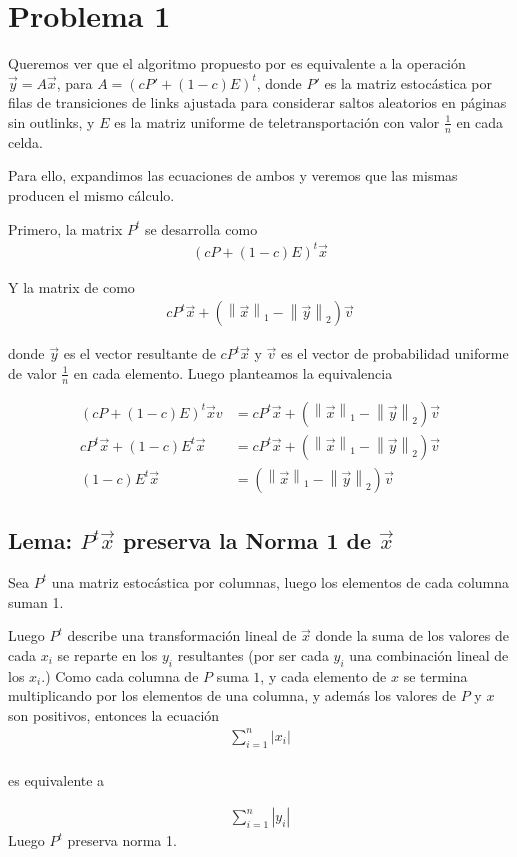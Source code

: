 \newcommand{\vectornorm}[1]{\left\|#1\right\|}
\section{Problema 1}
Queremos ver que el algoritmo propuesto por \cite[Algoritmo 1]{Kamvar2003} es equivalente
a la operación $\vec{y} = A\vec{x}$, para $A=(cP' + (1-c)E)^{t}$, donde $P'$ es la matriz 
estocástica por filas de transiciones de links ajustada para considerar saltos aleatorios
en páginas sin outlinks, y $E$ es la matriz uniforme de teletransportación con valor $\frac{1}{n}$ en cada celda.

Para ello, expandimos las ecuaciones de ambos y veremos que las mismas producen el mismo cálculo.

Primero, la matrix $P^{t}$ se desarrolla como 
\begin{align*}
(cP + (1 - c)E)^{t} \vec{x}
\end{align*}

Y la matrix de \cite[Algoritmo 1]{Kamvar 2003} como
\begin{align*}
cP^{t}\vec{x} + (\vectornorm{\vec{x}}_1 - \vectornorm{\vec{y}}_2)\vec{v}
\end{align*}

donde $\vec{y}$ es el vector resultante de $cP^{t}\vec{x}$ y $\vec{v}$ es el vector de probabilidad
uniforme de valor $\frac{1}{n}$ en cada elemento. Luego planteamos la equivalencia

\begin{align*}
(cP + (1-c)E)^{t} \vec{x} v&= cP^{t}\vec{x} + (\vectornorm{\vec{x}}_1 - \vectornorm{\vec{y}}_2)\vec{v} \\
cP^{t}\vec{x} + (1-c)E^{t}\vec{x} &= cP^{t}\vec{x} + (\vectornorm{\vec{x}}_1 - \vectornorm{\vec{y}}_2)\vec{v} \\
(1-c)E^{t}\vec{x} &= (\vectornorm{\vec{x}}_1 - \vectornorm{\vec{y}}_2)\vec{v}
\end{align*}

\subsection{Lema: $P^{t} \vec{x}$ preserva la Norma 1 de $\vec{x}$}
Sea $P^{t}$ una matriz estocástica por columnas, luego los elementos de cada columna suman 1.

Luego $P^{t}$ describe una transformación lineal de $\vec{x}$ donde la suma de los valores de cada $x_i$
se reparte en los $y_i$ resultantes (por ser cada $y_i$ una combinación lineal de los $x_i$.) 
Como cada columna de $P$ suma $1$, y cada elemento de $x$  se termina
multiplicando por los elementos de una columna, y además los valores de $P$ y $ x$  son positivos,
entonces la ecuación
\begin{align*}
\sum_{i=1}^{n} |x_i| \\
\end{align*}
\centerline{es equivalente a}
\begin{align*}
\sum_{i=1}^{n} |y_i|
\end{align*}
Luego $P^{t}$ preserva norma 1.

